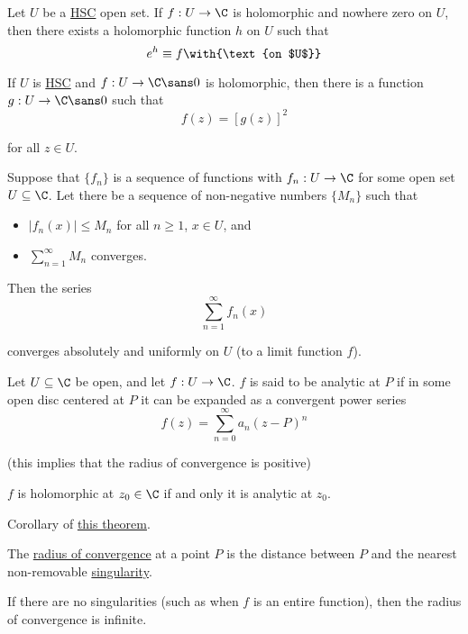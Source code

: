 \label{f18ba82}

Let $U$ be a \href{d20898f}{HSC} open set. If $f:U\to\C$ is holomorphic and
nowhere zero on $U$, then there exists a holomorphic function $h$ on $U$ such
that
$$
  e^h\equiv f\with{\text{on $U$}}
$$

\Corollary{}\label{bd18e65}

If $U$ is \href{d20898f}{HSC} and $f:U\to\C\sans0$ is holomorphic, then there
is a function $g:U\to\C\sans0$ such that
$$
  f(z)=[g(z)]^2
$$

for all $z\in U$.

\label{d4a96c1}

Suppose that $\{f_n\}$ is a sequence of functions with $f_n:U\to\C$ for some
open set $U\subseteq\C$. Let there be a sequence of non-negative numbers
$\{M_n\}$ such that
\begin{itemize}
  \item $|f_n(x)|\leq M_n$ for all $n\geq1$, $x\in U$, and
  \item $\sum_{n=1}^\infty M_n$ converges.
\end{itemize}

Then the series
\begin{equation*}
  \sum_{n=1}^\infty f_n(x)
\end{equation*}

converges absolutely and uniformly on $U$ (to a limit function $f$).

\label{ccd773b}

Let $U\subseteq\C$ be open, and let $f:U\to\C$. $f$ is said to be analytic at
$P$ if in some open disc centered at $P$ it can be expanded as a convergent
power series
$$
  f(z)=\sum_{n=0}^\infty a_n(z-P)^n
$$

(this implies that the radius of convergence is positive)

\label{c1a4a81}

$f$ is holomorphic at $z_0\in\C$ if and only it is analytic at $z_0$.

\label{ddc574e}

Corollary of \href{c1a4a81}{this theorem}.

The \href{da6e337}{radius of convergence} at a point $P$ is the distance
between $P$ and the nearest non-removable \href{a7f062e}{singularity}.

If there are no singularities (such as when $f$ is an entire function), then
the radius of convergence is infinite.
